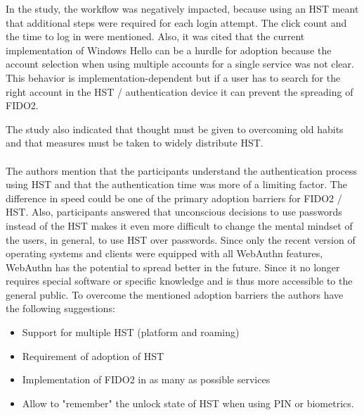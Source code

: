 \documentclass[runningheads]{llncs}
\begin{document}
In the study, the workflow was negatively impacted, because using an HST meant that additional steps were required for each login attempt. The click count and the time to log in were mentioned. Also, it was cited that the current implementation of Windows Hello can be a hurdle for adoption because the account selection when using multiple accounts for a single service was not clear. This behavior is implementation-dependent but if a user has to search for the right account in the HST / authentication device it can prevent the spreading of FIDO2. 

The study also indicated that thought must be given to overcoming old habits and that measures must be taken to widely distribute HST.

\paragraph{}
The authors mention that the participants understand the authentication process using HST and that the authentication time was more of a limiting factor. The difference in speed could be one of the primary adoption barriers for FIDO2 / HST. Also, participants answered that unconscious decisions to use passwords instead of the HST makes it even more difficult to change the mental mindset of the users, in general, to use HST over passwords. Since only the recent version of operating systems and clients were equipped with all WebAuthn features, WebAuthn has the potential to spread better in the future. Since it no longer requires special software or specific knowledge and is thus more accessible to the general public. To overcome the mentioned adoption barriers the authors have the following suggestions:
\begin{itemize}
  \item Support for multiple HST (platform and roaming)
  \item Requirement of adoption of HST
  \item Implementation of FIDO2 in as many as possible services
  \item Allow to "remember" the unlock state of HST when using PIN or biometrics.
\end{itemize}
\cite{255646}
\end{document}
